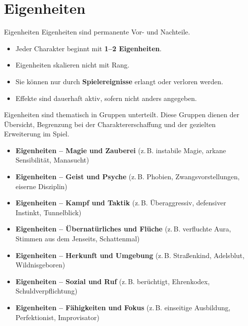\chapter{Eigenheiten}

\begin{rulebox}{Eigenheiten}
	Eigenheiten sind permanente Vor- und Nachteile.
	\begin{itemize}
		\item Jeder Charakter beginnt mit \textbf{1–2 Eigenheiten}.
		\item Eigenheiten skalieren nicht mit Rang.
		\item Sie können nur durch \textbf{Spielereignisse} erlangt oder verloren werden.
		\item Effekte sind dauerhaft aktiv, sofern nicht anders angegeben.
	\end{itemize}
\end{rulebox}

Eigenheiten sind thematisch in Gruppen unterteilt.  
Diese Gruppen dienen der Übersicht, Begrenzung bei der Charaktererschaffung
und der gezielten Erweiterung im Spiel.



	\begin{itemize}
		\item \textbf{Eigenheiten – Magie und Zauberei}  
		(z.\,B. instabile Magie, arkane Sensibilität, Manasucht)
		
		\item \textbf{Eigenheiten – Geist und Psyche}  
		(z.\,B. Phobien, Zwangsvorstellungen, eiserne Disziplin)
		
		\item \textbf{Eigenheiten – Kampf und Taktik}  
		(z.\,B. Überaggressiv, defensiver Instinkt, Tunnelblick)
		
		\item \textbf{Eigenheiten – Übernatürliches und Flüche}  
		(z.\,B. verfluchte Aura, Stimmen aus dem Jenseits, Schattenmal)
		
		\item \textbf{Eigenheiten – Herkunft und Umgebung}  
		(z.\,B. Straßenkind, Adelsblut, Wildnisgeboren)
		
		\item \textbf{Eigenheiten – Sozial und Ruf}  
		(z.\,B. berüchtigt, Ehrenkodex, Schuldverpflichtung)
		
		\item \textbf{Eigenheiten – Fähigkeiten und Fokus}  
		(z.\,B. einseitige Ausbildung, Perfektionist, Improvisator)
	\end{itemize}

